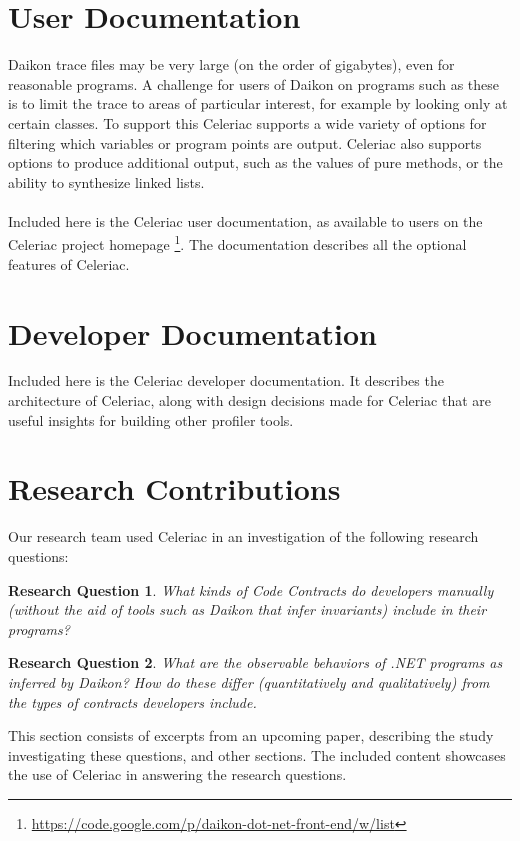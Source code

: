 \documentclass{article}
\newtheorem{research-question}{Research Question}[section]
\begin{document}
\section{User Documentation}
Daikon trace files may be very large (on the order of gigabytes), even for reasonable programs. A challenge for users of Daikon on programs such as these is to limit the trace to areas of particular interest, for example by looking only at certain classes. To support this Celeriac supports a wide variety of options for filtering which variables or program points are output. Celeriac also supports options to produce additional output, such as the values of pure methods, or the ability to synthesize linked lists.
\\ \\
Included here is the Celeriac user documentation, as available to users on the Celeriac project homepage \footnote{\url{https://code.google.com/p/daikon-dot-net-front-end/w/list}}. The documentation describes all the optional features of Celeriac.

\newpage
\section{Developer Documentation}
Included here is the Celeriac developer documentation. It describes the architecture of Celeriac, along with design decisions made for Celeriac that are useful insights for building other profiler tools.

\newpage
\section{Research Contributions}
Our research team used Celeriac in an investigation of the following research questions:

\begin{research-question}
  What kinds of Code Contracts do developers manually (without the aid of tools such as Daikon that infer invariants) include in their programs?
\end{research-question}
\begin{research-question}
  What are the observable behaviors of .NET programs as inferred by Daikon? How do these differ (quantitatively and qualitatively) from the types of contracts developers include. 
\end{research-question}

This section consists of excerpts from an upcoming paper, describing the study investigating these questions, and other sections. The included content showcases the use of Celeriac in answering the research questions.
\end{document}
